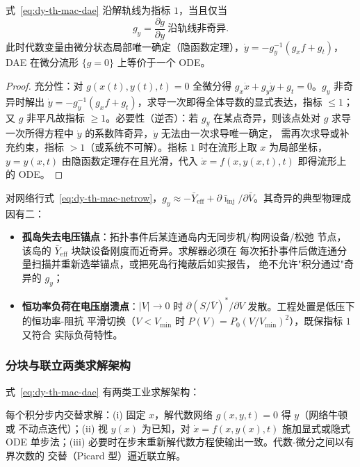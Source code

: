\begin{proposition}\label{prop:dy-th-mac-index1}
式~\eqref{eq:dy-th-mac-dae} 沿解轨线为指标 $1$，当且仅当
\begin{equation}
g_y=\frac{\partial g}{\partial y}\ \text{沿轨线非奇异}.
\label{eq:dy-th-mac-gy}
\end{equation}
此时代数变量由微分状态局部唯一确定（隐函数定理），$\dot y=-g_y^{-1}(g_xf+g_t)$，
DAE 在微分流形 $\{g=0\}$ 上等价于一个 ODE。
\end{proposition}

\begin{proof}
充分性：对 $g(x(t),y(t),t)=0$ 全微分得
$g_x\dot x+g_y\dot y+g_t=0$。$g_y$ 非奇异时解出
$\dot y=-g_y^{-1}(g_xf+g_t)$，求导一次即得全体导数的显式表达，指标 $\le1$；
又 $g$ 非平凡故指标 $\ge1$。必要性（逆否）：若 $g_y$ 在某点奇异，则该点处对
$g$ 求导一次所得方程中 $\dot y$ 的系数阵奇异，$\dot y$ 无法由一次求导唯一确定，
需再次求导或补充约束，指标 $>1$（或系统不可解）。指标 $1$ 时在流形上取
$x$ 为局部坐标，$y=y(x,t)$ 由隐函数定理存在且光滑，代入 $\dot x=f(x,y(x,t),t)$
即得流形上的 ODE。
\end{proof}

对网络行式~\eqref{eq:dy-th-mac-netrow}，$g_y\approx-\bar Y_{\mathrm{eff}}
+\partial\bar\imath_{\mathrm{inj}}/\partial\bar V$。其奇异的典型物理成因有二：
\begin{itemize}
  \item \textbf{孤岛失去电压锚点}：拓扑事件后某连通岛内无同步机/构网设备/松弛
        节点，该岛的 $\bar Y_{\mathrm{eff}}$ 块缺设备刚度而近奇异。求解器必须在
        每次拓扑事件后做连通分量扫描并重新选举锚点，或把死岛行掩蔽后如实报告，
        绝不允许"积分通过"奇异的 $g_y$；
  \item \textbf{恒功率负荷在电压崩溃点}：$|V|\to0$ 时
        $\partial(S/\bar V)^{*}/\partial V$ 发散。工程处置是低压下的恒功率-阻抗
        平滑切换（$V<V_{\min}$ 时 $P(V)=P_0(V/V_{\min})^2$），既保指标 $1$ 又符合
        实际负荷特性。
\end{itemize}

\subsubsection{分块与联立两类求解架构}

式~\eqref{eq:dy-th-mac-dae} 有两类工业求解架构：

\begin{definition}[分块（partitioned）架构]\label{def:dy-th-mac-partitioned}
每个积分步内交替求解：(i) 固定 $x$，解代数网络 $g(x,y,t)=0$ 得 $y$（网络牛顿或
不动点迭代）；(ii) 视 $y(x)$ 为已知，对 $\dot x=f(x,y(x),t)$ 施加显式或隐式 ODE
单步法；(iii) 必要时在步末重新解代数方程使输出一致。代数-微分之间以有界次数的
交替（Picard 型）逼近联立解。
\end{definition}

